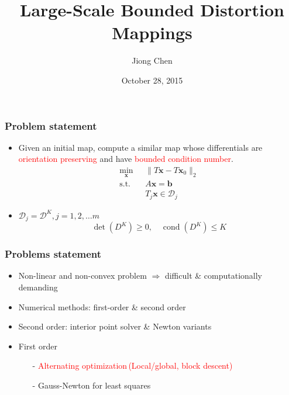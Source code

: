 \documentclass[serif,mathserif]{beamer}
\author[Jiong Chen]{Jiong Chen}
\title[\hspace{2em}\insertframenumber/\inserttotalframenumber]{Large-Scale Bounded Distortion Mappings}
\date{October 28, 2015} %
\newcommand{\BOLD}[1]{\mathbf{#1}}
\newcommand{\TODO}[1]{\textcolor{red}{#1}}
\DeclareMathOperator{\cond}{cond}
\DeclareMathOperator{\ST}{s.t.}
\begin{document}
\maketitle

\begin{frame}
 \frametitle{Problem statement}
 \begin{itemize}
  \item Given an initial map, compute a similar map whose differentials are \TODO{orientation preserving}
  and have \TODO{bounded condition number}.
  \Large
 \begin{equation*}
 \boxed{
  \begin{aligned}
    \min_{\BOLD{x}}~~&\|T\BOLD{x}-T\BOLD{x}_0\|_2  \\ 
    \ST \quad &A\BOLD{x} = \BOLD{b}\\
    &T_j\BOLD{x} \in \mathcal{D}_j
  \end{aligned}
 }
 \end{equation*}
 \large
 \item $\mathcal{D}_j=\mathcal{D}^K, j=1,2,\dots m$
 \begin{equation*}
  \det(D^K) \ge  0, \quad \cond(D^K) \le K
 \end{equation*}
 \end{itemize}
\end{frame}

\begin{frame}
 \frametitle{Problems statement}
 \begin{itemize}
  \item Non-linear and non-convex problem $\Rightarrow$ difficult \& computationally demanding
  \item Numerical methods: first-order \& second order
  \item Second order: interior point solver \& Newton variants
  \item First order 
    \begin{itemize}
     \item[-] \textcolor{red}{Alternating optimization\,(Local/global, block descent)}
     \item[-] \textcolor{green!50!black}{Gauss-Newton for least squares}
    \end{itemize}
 \end{itemize}
  {
 }
\end{frame}
\end{document}
